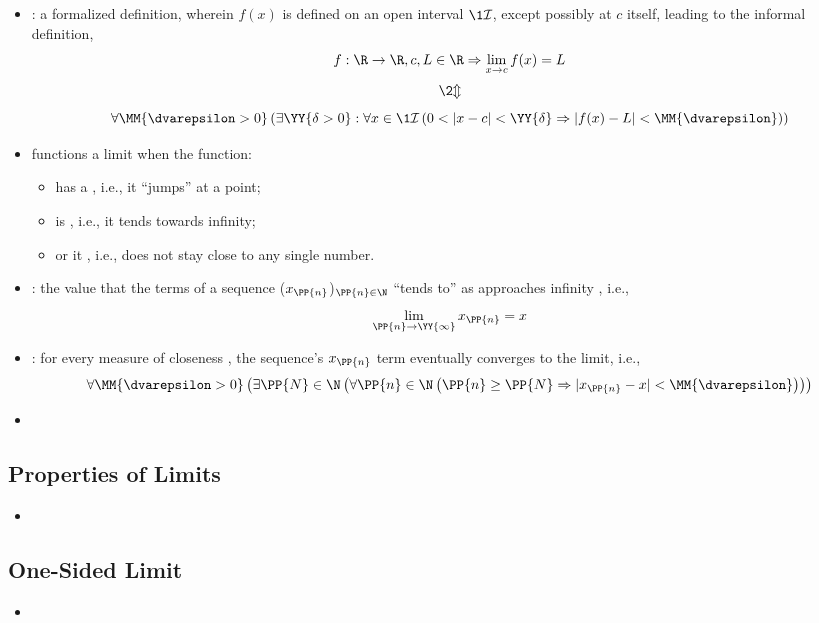 \begin{itemize}
\begin{itemize}
 \item {}: a formalized
   definition, wherein \(f(x)\) is defined on an open interval
   \(\1{\mathcal{I}}\), except possibly at \(c\) itself, leading to the
   informal definition, 
   \[
    f : \R \to \R, c,L \in \R \Rightarrow \lim_{x \to c} f(x) = L
  \]\vspace{-24pt}
   \[
    \2{\Updownarrow}
   \]
   \[
     \forall \MM{\dvarepsilon > 0} \left(
       \exists \YY{\delta > 0} : \forall x \in \1{\mathcal{I}} \left(
        0 < |x-c| < \YY{\delta} \Rightarrow |f(x)-L| < \MM{\dvarepsilon}
        \right)
      \right)
   \]
  \item functions  a limit when the function:
    \begin{itemize}
      \item has a , i.e., it ``jumps'' at a point;
      \item is , i.e., it tends towards infinity;
      \item or it , i.e., does not stay close to any single number.
    \end{itemize}

  \item {}: the value that the terms of a sequence
    (\(x_\PP{n}\))\(_{\PP{n} \in \N}\) ``tends to''  as 
    approaches infinity , i.e.,
    \[
      \lim_{\PP{n} \to \YY{\infty}} x_\PP{n} = x
    \]
    \item {}: for every measure of
      closeness \MM{\( \varepsilon\)}, the sequence's \( x_\PP{n}\) term eventually
      converges to the limit, i.e.,
      \[
        \forall \MM{ \dvarepsilon > 0} \left(
          \exists \PP{N} \in \N \left(
            \forall\PP{n} \in \N \left(
              \PP{n} \ge \PP{N} \Rightarrow |x_\PP{n} - x| < \MM{ \dvarepsilon}
            \right)
          \right)
        \right)
      \]
      \item

  \end{itemize}


  \subsection{Properties of Limits}
  \begin{itemize}
    \item
  \end{itemize}

  \subsection{One-Sided Limit}
  \begin{itemize}
    \item
  \end{itemize}
\end{itemize}

